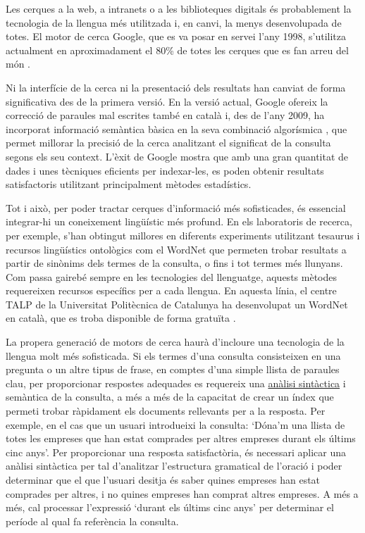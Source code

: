 \documentclass[]{../../metanetpaper}
\begin{document}
\begin{multicols}{2}
Les cerques a la web, a intranets o a les biblioteques digitals és probablement la tecnologia de la llengua més utilitzada i, en canvi, la menys desenvolupada de totes. El motor de cerca Google, que es va posar en servei l’any 1998, s’utilitza actualment en aproximadament el 80\% de totes les cerques que es fan arreu del món \cite{CAT-Nota22}. 

Ni la interfície de la cerca ni la presentació dels resultats han canviat de forma significativa des de la primera versió. En la versió actual, Google ofereix la correcció de paraules mal escrites també en català i, des de l’any 2009, ha incorporat informació semàntica bàsica en la seva combinació algorísmica \cite{CAT-Nota23}, que permet millorar la precisió de la cerca analitzant el significat de la consulta segons els seu context. L’èxit de Google mostra que amb una gran quantitat de dades i unes tècniques eficients per indexar-les, es poden obtenir resultats satisfactoris utilitzant principalment mètodes estadístics.

Tot i això, per poder tractar cerques d’informació més sofisticades, és essencial integrar-hi un coneixement lingüístic més profund. En els laboratoris de recerca, per exemple, s’han obtingut millores en diferents experiments utilitzant tesaurus i recursos lingüístics ontològics com el WordNet que permeten trobar resultats a partir de sinònims dels termes de la consulta, o fins i tot termes més llunyans. Com passa gairebé sempre en les tecnologies del llenguatge, aquests mètodes requereixen recursos específics per a cada llengua. En aquesta línia, el centre TALP de la Universitat Politècnica de Catalunya ha desenvolupat un WordNet en català, que es troba disponible de forma gratuïta \cite{CAT-Nota24}. 

La propera generació de motors de cerca haurà d’incloure una tecnologia de la llengua molt més sofisticada. Si els termes d’una consulta consisteixen en una pregunta o un altre tipus de frase, en comptes d’una simple llista de paraules clau, per proporcionar respostes adequades es requereix una \underline{anàlisi sintàctica} i semàntica de la consulta, a més  a més de la capacitat de crear un índex que permeti trobar ràpidament els documents rellevants per a la resposta. Per exemple, en el cas que un usuari introdueixi la consulta: ‘Dóna’m una llista de totes les empreses que han estat comprades per altres empreses durant els últims cinc anys’. Per proporcionar una resposta satisfactòria, és necessari aplicar una anàlisi sintàctica per tal d’analitzar l’estructura gramatical de l’oració i poder determinar que el que l’usuari desitja és saber quines empreses han estat comprades per altres, i no quines empreses han comprat altres empreses. A més a més, cal processar  l’expressió ‘durant els últims cinc anys’ per determinar el període al qual fa referència la consulta. 


\end{multicols}
\end{document}
